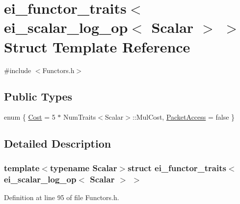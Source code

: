 \hypertarget{structei__functor__traits_3_01ei__scalar__log__op_3_01_scalar_01_4_01_4}{\section{ei\-\_\-functor\-\_\-traits$<$ ei\-\_\-scalar\-\_\-log\-\_\-op$<$ Scalar $>$ $>$ Struct Template Reference}
\label{structei__functor__traits_3_01ei__scalar__log__op_3_01_scalar_01_4_01_4}
}


{\ttfamily \#include $<$Functors.\-h$>$}

\subsection*{Public Types}
\begin{DoxyCompactItemize}
\item 
enum \{ \hyperlink{structei__functor__traits_3_01ei__scalar__log__op_3_01_scalar_01_4_01_4_acc398f3584c2e11df221d585865f16adaffc7c40462c7370496dd70286e08a659}{Cost} = 5 $\ast$ Num\-Traits$<$Scalar$>$\-:\-:Mul\-Cost, 
\hyperlink{structei__functor__traits_3_01ei__scalar__log__op_3_01_scalar_01_4_01_4_acc398f3584c2e11df221d585865f16ada4ab2956e9b265f6e09031b6504ea42df}{Packet\-Access} = false
 \}
\end{DoxyCompactItemize}


\subsection{Detailed Description}
\subsubsection*{template$<$typename Scalar$>$struct ei\-\_\-functor\-\_\-traits$<$ ei\-\_\-scalar\-\_\-log\-\_\-op$<$ Scalar $>$ $>$}



Definition at line 95 of file Functors.\-h.



